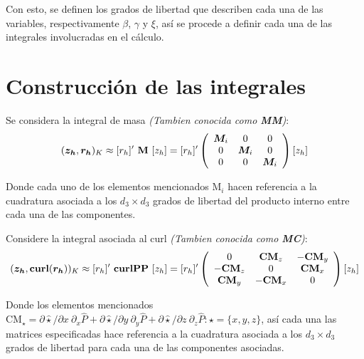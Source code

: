 \documentclass{article}
\begin{document}
\noindent Con esto, se definen los grados de libertad que describen cada una de las variables, respectivamente $\beta$, $\gamma$ y $\xi$, así se procede a definir cada una de las integrales involucradas en el cálculo.

\section{Construcción de las integrales}

\noindent Se considera la integral de masa \textit{(Tambien conocida como \textbf{MM})}:
\begin{align}
    (\boldsymbol{z_h}, \boldsymbol{r_h})_K \approx
    [r_h]'~\mathbf{M}~[z_h] = 
    [r_h]'
    \left(
    \begin{array}{ccc}
       \boldsymbol{M}_i  & 0 & 0 \\
        0 & \boldsymbol{M}_i & 0 \\
        0 & 0 & \boldsymbol{M}_i \\
    \end{array}
    \right)
    [z_h]
\end{align}

\noindent Donde cada uno de los elementos mencionados $\mathrm{M}_i$ hacen referencia a la cuadratura asociada a los $d_3 \times d_3$ grados de libertad del producto interno entre cada una de las componentes.

\vspace{1mm}
\noindent Considere la integral asociada al curl \textit{(Tambien conocida como \textbf{MC})}:
\begin{align}
\label{eq:5}
    (\boldsymbol{z_h}, \textbf{\textup{curl}}(\boldsymbol{r_h}))_K \approx
    [r_h]'~\mathbf{curlPP}~[z_h] = 
    [r_h]'
    \left(
    \begin{array}{ccc}
        0 & \mathbf{CM}_z & -\mathbf{CM}_y\\
        -\mathbf{CM}_z & 0 & \mathbf{CM}_x \\
        \mathbf{CM}_y & -\mathbf{CM}_x & 0 \\
    \end{array}
    \right)
    [z_h]
\end{align}

\noindent Donde los elementos mencionados $\mathrm{CM}_\star = \partial \hat{\star} / \partial x~\partial_x\hat{P} + \partial \hat{\star} / \partial y~\partial_y\hat{P} + \partial \hat{\star} / \partial z~ \partial_z\hat{P} : \star = \lbrace x, y, z \rbrace$, así cada una las matrices especificadas hace referencia a la cuadratura asociada a los $d_3 \times d_3$ grados de libertad para cada una de las componentes asociadas.
\end{document}
